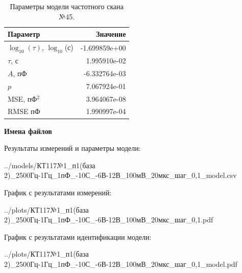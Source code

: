\begin{table}[!ht]
    \centering
    \caption{Параметры модели частотного скана №45.}
    \begin{tabular}{|l|r|}
        \hline
        Параметр                                       & Значение                  \\ \hline
        $\log_{10}(\tau)$, $\log_{10}$(с)              & -1.699859e+00             \\ \hline
        $\tau$, с                                      & 1.995910e-02              \\ \hline
        $A$, пФ                                        & -6.332764e-03             \\ \hline
        $p$                                            & 7.067924e-01              \\ \hline
        MSE, пФ$^2$                                    & 3.964067e-08              \\ \hline
        RMSE пФ                                        & 1.990997e-04              \\ \hline
    \end{tabular}
    \label{table:frequency_scan_model_45}
\end{table}

\textbf{Имена файлов}

Результаты измерений и параметры модели:

\scriptsize../models/КТ117№1\_п1(база 2)\_2500Гц-1Гц\_1пФ\_-10С\_-6В-12В\_100мВ\_20мкс\_шаг\_0,1\_model.csv
\normalsize

График с результатами измерений:

\scriptsize../plots/КТ117№1\_п1(база 2)\_2500Гц-1Гц\_1пФ\_-10С\_-6В-12В\_100мВ\_20мкс\_шаг\_0,1.pdf
\normalsize

График с результатами идентификации модели:

\scriptsize../plots/КТ117№1\_п1(база 2)\_2500Гц-1Гц\_1пФ\_-10С\_-6В-12В\_100мВ\_20мкс\_шаг\_0,1\_model.pdf
\normalsize

